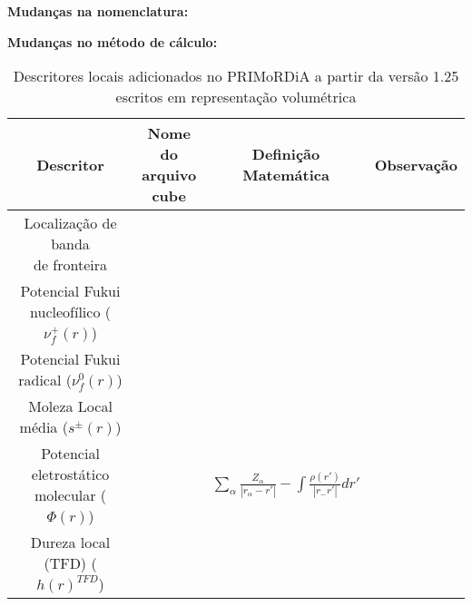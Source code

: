 \documentclass[a4paper,11pt]{refart}
\begin{document}
\textbf{Mudanças na nomenclatura:}

\textbf{Mudanças no método de cálculo:}



\hspace*{-\leftmarginwidth}
\begin{minipage}{\fullwidth}
	\begin{table}[H]
		\centering	
		\caption{Descritores locais adicionados no PRIMoRDiA a partir da versão 1.25 escritos em representação volumétrica}
		\begin{tabular}{c|c|c|c}
			\toprule
			Descritor &\makecell{Nome do\\ arquivo\\ cube}&\makecell{Definição\\Matemática}& Observação \\
			\midrule
			\makecell{Localização de banda\\de fronteira} & & &  \\\hline
			\makecell{Potencial Fukui\\ nucleofílico ($\nu_{f}^{+}(r)$)} & & &  \\\hline
			\makecell{Potencial Fukui\\ radical ($\nu_{f}^{0}(r)$)} & & &  \\\hline
			\makecell{Moleza Local \\média ($s^{\pm}(r)$)} & & &  \\\hline
			\makecell{Potencial eletrostático\\molecular ($\Phi(r)$) } & & $\sum_{\alpha} \frac{Z_{\alpha}}{|r_{\alpha}-r'|}  - \int\frac{\rho(r')}{|r_-r'|}dr'$&  \\\hline
			\makecell{Dureza local \\(TFD) ($h(r)^{TFD}$)} & & &  \\
			\bottomrule
		\end{tabular} 
		\label{tab_local3}	
	\end{table}	
\end{minipage}
\end{document}
